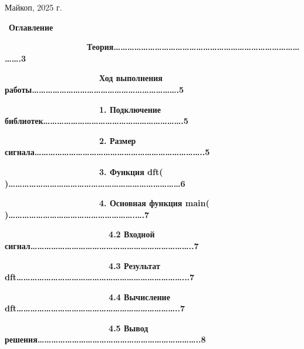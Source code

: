 \documentclass[a4paper]{article}
\begin{document}
\bigskip


\bigskip


\bigskip

{\centering{}
Майкоп, 2025 г.
\par}

{
\ \textbf{Оглавление }}


\bigskip

{
\ \ \ \ \ \ \ \ \ \ \ \ \ \ \ \ \ \ \ \ \textbf{Теория…………………………………………………………………………….3}}


\bigskip

{\bfseries
\ \ \ \ \ \ \ \ \ \ \ \ \ \ \ \ \ \ \ \ Ход выполнения работы……………………………………………………….5}


\bigskip

{\bfseries
\ \ \ \ \ \ \ \ \ \ \ \ \ \ \ \ \ \ \ \ 1. Подключение библиотек…………………………………………………….5}


\bigskip

{\bfseries
\ \ \ \ \ \ \ \ \ \ \ \ \ \ \ \ \ \ \ \ 2. Размер сигнала………………………………………………………………..5}


\bigskip

{\bfseries
\foreignlanguage{russian}{\ \ \ \ \ \ \ \ \ \ \ \ \ \ \ \ \ \ \ \ 3. Функция }\foreignlanguage{english}{dft(
)…………………………………………………………………}\foreignlanguage{russian}{6}}


\bigskip

{\bfseries
\ \ \ \ \ \ \ \ \ \ \ \ \ \ \ \ \ \ \ \ 4. Основная функция \foreignlanguage{english}{main}\foreignlanguage{russian}{(
)……………………………………………….….7}}


\bigskip

{\bfseries
\foreignlanguage{russian}{\ \ \ \ \ \ \ \ \ \ \ \ \ \ \ \ \ \ \ \ \ \ 4.2 Входной сигнал……………………………………………………………..7}}


\bigskip

{\bfseries
\foreignlanguage{russian}{\ \ \ \ \ \ \ \ \ \ \ \ \ \ \ \ \ \ \ \ \ \ 4.3 Результат
}\foreignlanguage{english}{dft………………………………………………………………...}\foreignlanguage{russian}{7}}


\bigskip

{\bfseries
\foreignlanguage{english}{\ \ \ \ \ \ \ \ \ \ \ \ \ \ \ \ \ \ \ \ \ \ }\foreignlanguage{russian}{4.4 Вычисление
}\foreignlanguage{english}{dft……………………………………………………………..}\foreignlanguage{russian}{7}}


\bigskip

{\bfseries
\ \ \ \ \ \ \ \ \ \ \ \ \ \ \ \ \ \ \ \ \ \ 4.5 Вывод решения……………………………………………………………..8}
\end{document}
